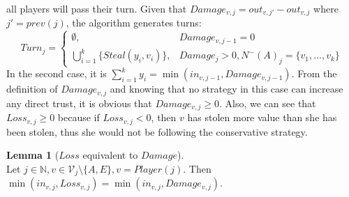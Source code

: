 \documentclass[11pt]{article}
\theoremstyle{definition}
\theoremstyle{corollary}
\theoremstyle{lemma}
\newtheorem{lemma}{Lemma}[section]
\begin{document}
    all players will pass their turn.
    Given that $Damage_{v,j} = out_{v,j'} - out_{v,j}$ where $j' = prev(j)$, the algorithm generates turns:
    $$Turn_j =
      \begin{cases}
         \emptyset, & Damage_{v,j-1} = 0 \\
         \bigcup\limits_{i=1}^{k}\{Steal(y_i,v_i)\}, & Damage_j > 0, N^{-}(A)_j = \{v_1,...,v_k\}
      \end{cases}$$
    In the second case, it is $\sum\limits_{i=1}^{k}y_i = \min(in_{v, j-1}, Damage_{v, j-1})$. From the
    definition of $Damage_{v,j}$ and knowing that no strategy in this case can increase any direct trust, it is obvious
    that $Damage_{v,j} \geq 0$. Also, we can see that $Loss_{v,j} \geq 0$
    because if $Loss_{v,j} < 0$, then $v$ has stolen more value than she has been stolen, thus she would not be following the
    conservative strategy.
    \begin{lemma}[$Loss$ equivalent to $Damage$] \ \\
       Let $j \in \mathbb{N}, v \in \mathcal{V}_j \setminus \{A, E\}, v = Player(j)$. Then $\min(in_{v, j}, Loss_{v, j}) = 
       \min(in_{v, j}, Damage_{v, j})$.
    \end{lemma}
\end{document}
